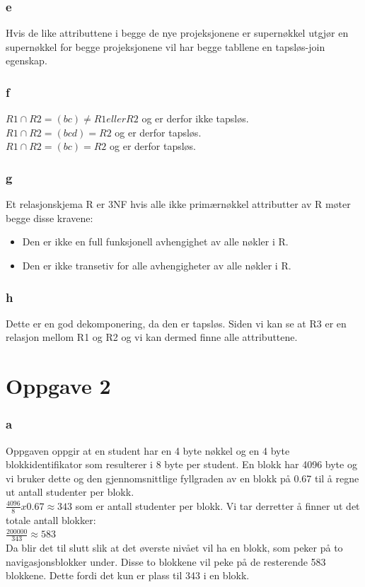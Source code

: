 \documentclass[a4paper, 10pt]{article}
\begin{document}
\subsubsection*{e}
Hvis de like attributtene i begge de nye projeksjonene er supernøkkel utgjør en supernøkkel for begge projeksjonene vil har begge tabllene en tapsløs-join egenskap.

\subsubsection*{f}
$R1 \cap R2 = (bc) \neq R1 eller R2$ og er derfor ikke tapsløs.\\
$R1 \cap R2 = (bcd) = R2$ og er derfor tapsløs.\\
$R1 \cap R2 = (bc) = R2$ og er derfor tapsløs.\\


\subsubsection*{g}
Et relasjonskjema R er 3NF hvis alle ikke primærnøkkel attributter av R møter begge disse kravene:
\begin{itemize}
	\item Den er ikke en full funksjonell avhengighet av alle nøkler i R.
	\item Den er ikke transetiv for alle avhengigheter av alle nøkler i R.
\end{itemize}

\subsubsection*{h}
Dette er en god dekomponering, da den er tapsløs. Siden vi kan se at R3 er en relasjon mellom R1 og R2 og vi kan dermed finne alle attributtene.

\section*{Oppgave 2}

\subsubsection*{a}
Oppgaven oppgir at en student har en 4 byte nøkkel og en 4 byte blokkidentifikator som resulterer i 8 byte per student. En blokk har 4096 byte og vi bruker dette og den gjennomsnittlige fyllgraden av en blokk på 0.67 til å regne ut antall studenter per blokk.\\
$\frac{4096}{8} x 0.67 \approx 343$ som er antall studenter per blokk. Vi tar derretter å finner ut det totale antall blokker: \\
$\frac{200 000}{343} \approx 583$\\
Da blir det til slutt slik at det øverste nivået vil ha en blokk, som peker på to navigasjonsblokker under. Disse to blokkene vil peke på de resterende 583 blokkene. Dette fordi det kun er plass til 343 i en blokk.
\end{document}
